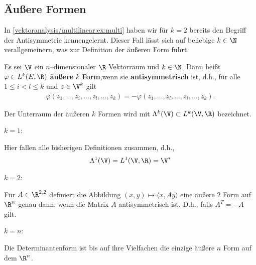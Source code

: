 \subsection{Äußere Formen}
\label{\detokenize{vektoranalysis/multilinear:auszere-formen}}
\par
In \cref{vektoranalysis/multilinear:ex:multi} haben wir für \(k=2\) bereits den Begriff der Antisymmetrie kennengelernt. Dieser Fall lässt sich auf beliebige \(k\in\N\) verallgemeinern, was zur Definition der äußeren Form führt.
\label{vektoranalysis/multilinear:aeussere_Form}
\begin{definition}{}{}



\par
Es sei \(\V\) ein \(n\)–dimensionaler \(\R\) Vektorraum und \(k\in\N\). Dann heißt \(\varphi\in L^k(E,\R)\)
\textbf{äußere} \(k\)\textbf{ Form},wenn sie \textbf{antisymmetrisch} ist, d.h., für alle \(1\leq i<l\leq k\) und
\(z\in \V^k\) gilt
\begin{align*}
\varphi(z_1,\ldots,z_i,\ldots,z_l,\ldots,z_k) =-\varphi(z_1,\ldots,z_l,\ldots,z_i,\ldots,z_k).
\end{align*}
\par
Der Unterraum der äußeren \(k\) Formen wird mit \(\Lambda^k(\V)\subset L^k(\V,\R)\) bezeichnet.
\end{definition}
\label{vektoranalysis/multilinear:example-14}
\begin{example}{}{}



\par
\(k=1\):

\par
Hier fallen alle bisherigen Definitionen zusammen, d.h.,
\begin{align*}
\Lambda^1(\V) = L^1(\V,\R)= \V^\ast
\end{align*}
\par
\(k=2\):

\par
Für \(A\in\R^{2,2}\) definiert die Abbildung \((x,y)\mapsto\langle x,A y\rangle\) eine äußere \(2\) Form auf \(\R^n\) genau dann, wenn die Matrix \(A\) antisymmetrisch ist. D.h., falls \(A^T=-A\) gilt.

\par
\(k=n\):

\par
Die Determinantenform ist bis auf ihre Vielfachen die einzige äußere \(n\) Form auf dem \(\R^n\).
\end{example}

